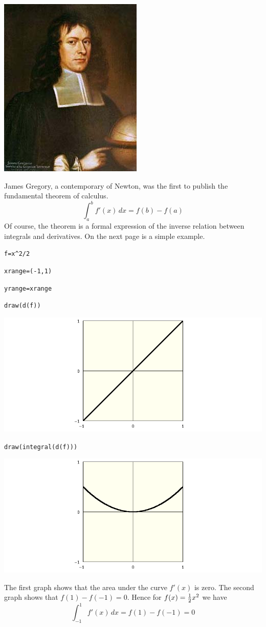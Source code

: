 \begin{center}
\includegraphics[]{JamesGregory.jpeg}
\end{center}

\bigskip

\noindent
James Gregory, a contemporary of Newton, was the first to publish the fundamental theorem of calculus.
$$\int_a^b f'(x)\,dx=f(b)-f(a)$$
Of course, the theorem is a formal expression of the inverse relation between integrals and derivatives.
On the next page is a simple example.

\newpage

\verb$f=x^2/2$

\verb$xrange=(-1,1)$

\verb$yrange=xrange$

\verb$draw(d(f))$

\noindent
\includegraphics[scale=0.5]{funda1.png}

\verb$draw(integral(d(f)))$

\medskip
\noindent
\includegraphics[scale=0.5]{funda2.png}

\medskip
\noindent
The first graph shows that the area under the curve $f'(x)$ is zero.
The second graph shows that $f(1)-f(-1)=0$.
Hence for $f(x)={1\over2}x^2$ we have
$$\int_{-1}^1f'(x)\,dx=f(1)-f(-1)=0$$


